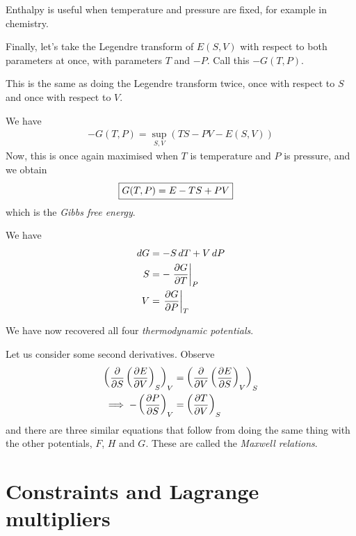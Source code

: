 \documentclass{../../template/note}
\begin{document}
    \begin{remark*}
        Enthalpy is useful when temperature and pressure are fixed, for example in chemistry.
    \end{remark*}
    
    Finally, let's take the Legendre transform of $E(S, V)$ with respect to both parameters at once, with parameters $T$ and $-P$. Call this $-G(T, P)$.

    \begin{remark*}
        This is the same as doing the Legendre transform twice, once with respect to $S$ and once with respect to $V$.
    \end{remark*}
    
    We have
    \begin{align*}
        -G(T, P) = \sup_{S, V} \left(TS-PV-E(S, V)\right)
    \end{align*}
    Now, this is once again maximised when $T$ is temperature and $P$ is pressure, and we obtain
    \begin{align*}
        \Aboxed{G(T, P) = E - TS + PV}
    \end{align*}
    which is the \emph{Gibbs free energy}.
    
    \begin{proposition}
        We have
        \begin{align*}
            dG &= -S \D T + V \D P \\
            S &= -\pd[P]{G}{T} \\
            V &= \pd[T]{G}{P}
        \end{align*}
    \end{proposition}
    
    We have now recovered all four \emph{thermodynamic potentials}.
    

    Let us consider some second derivatives. Observe
    \begin{align*}
        \left(\pd{}{S}\left(\pd{E}{V}\right)_S\right)_V &= \left(\pd{}{V}\left(\pd{E}{S}\right)_V\right)_S \\
        \implies -\left(\pd{P}{S}\right)_V &= \left(\pd{T}{V}\right)_S
    \end{align*}
    and there are three similar equations that follow from doing the same thing with the other potentials, $F$, $H$ and $G$. These are called the \emph{Maxwell relations}.
    
    \section{Constraints and Lagrange multipliers}
\end{document}
